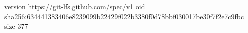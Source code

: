 version https://git-lfs.github.com/spec/v1
oid sha256:634441383406e8239099b22429f022b3380f0d78bbf030017be30f7f2e7c9fbc
size 377
